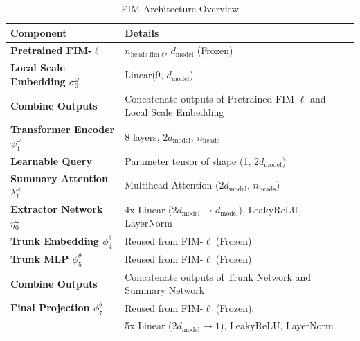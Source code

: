\documentclass{article}
\theoremstyle{plain}
\theoremstyle{definition}
\theoremstyle{remark}
\begin{document}
\begin{table}[h!]
    \centering
    \label{tab:architecture_megatron}
    \renewcommand{\arraystretch}{1.2} %
    \begin{tabular}{p{} p{}}
    \toprule
    \textbf{Component}               & \textbf{Details} \\ \midrule
    \textbf{Pretrained FIM-$\ell$}   & $n_\text{heads-fim-$\ell$}$, $d_\text{model}$ (Frozen) \\ \midrule
    \textbf{Local Scale Embedding $\sigma^{\omega}_0$}   & Linear(9, $d_\text{model}$) \\ \midrule
    
    \textbf{Combine Outputs}         & Concatenate outputs of Pretrained FIM-$\ell$ and Local Scale Embedding \\ \midrule
    \textbf{Transformer Encoder $\psi^{\omega}_1$}     & 8 layers, $2d_\text{model}$, $n_\text{heads}$ \\ \midrule
    
    
    \textbf{Learnable Query}         & Parameter tensor of shape (1, $2d_\text{model}$)\\ \midrule
    \textbf{Summary Attention  $\lambda^{\omega}_1$}       & Multihead Attention ($2d_\text{model}$, $n_\text{heads}$) \\ \midrule
    
    \textbf{Extractor Network $\eta^{\omega}_0$} & 4x Linear ($2d_\text{model} \to d_\text{model}$), LeakyReLU, LayerNorm \\ \midrule
    
    \textbf{Trunk Embedding $\phi^{\theta}_4$}         & Reused from FIM-$\ell$ (Frozen)\\ \midrule
    \textbf{Trunk MLP $\phi^{\theta}_5$}           & Reused from FIM-$\ell$ (Frozen) \\ \midrule
    \textbf{Combine Outputs}         & Concatenate outputs of Trunk Network and Summary Network \\ \midrule
    \textbf{Final Projection $\phi^{\theta}_7$}        & Reused from FIM-$\ell$ (Frozen): \\ 
                                      & \quad 5x Linear ($2d_\text{model} \to 1$), LeakyReLU, LayerNorm \\ 
    \bottomrule
    \end{tabular}
    \caption{FIM Architecture Overview}

    \end{table}
    
\end{document}
